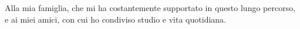 
Alla mia famiglia, che mi ha costantemente supportato in questo lungo percorso, e ai miei amici, con cui ho condiviso studio e vita quotidiana.